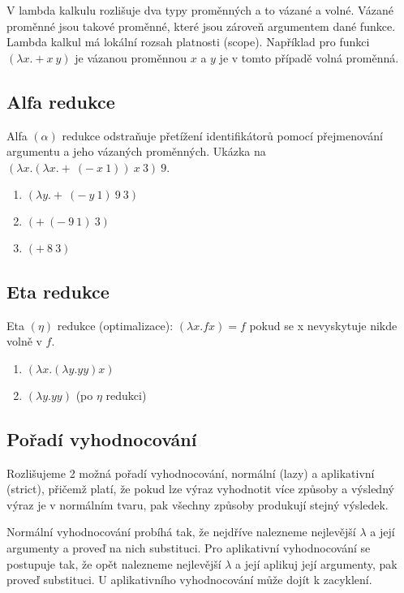 \documentclass{szzclass}
\begin{document}
V lambda kalkulu rozlišuje dva typy proměnných a to vázané a volné. Vázané proměnné jsou takové proměnné, které jsou zároveň argumentem dané funkce. Lambda kalkul má lokální rozsah platnosti (scope). Například pro funkci $(\lambda x . + x\ y)$ je vázanou proměnnou $x$ a $y$ je v tomto případě volná proměnná.

\newpage

\subsection{Alfa redukce}

Alfa $(\alpha)$ redukce odstraňuje přetížení identifikátorů pomocí přejmenování argumentu a jeho vázaných proměnných.
Ukázka na $(\lambda x . (\lambda x . +\ (-\ x\ 1))\ x\ 3)\ 9$.
\begin{enumerate}
    \item $(\lambda y . +\ (-\ y\ 1)\ 9\ 3)$
    \item $(+\ (-\ 9\ 1)\ 3)$
    \item $(+\ 8\ 3)$
\end{enumerate}


\subsection{Eta redukce}
Eta $(\eta)$ redukce (optimalizace): $(\lambda x. fx) = f$ pokud se x nevyskytuje nikde volně v $f$.

\begin{enumerate}
    \item $(\lambda x.(\lambda y.yy)x)$
    \item $(\lambda y. yy)$ (po $\eta$ redukci)
\end{enumerate}


\subsection{Pořadí vyhodnocování}

Rozlišujeme 2 možná pořadí vyhodnocování, normální (lazy) a aplikativní (strict), přičemž platí, že pokud lze výraz
vyhodnotit více způsoby a výsledný výraz je v normálním tvaru, pak všechny způsoby produkují stejný výsledek.

Normální vyhodnocování probíhá tak, že nejdříve nalezneme nejlevější $\lambda$ a její argumenty a proveď na nich substituci.
Pro aplikativní vyhodnocování se postupuje tak, že opět nalezneme nejlevější $\lambda$ a její aplikuj její argumenty, pak proveď substituci.
U aplikativního vyhodnocování může dojít k zacyklení.
\end{document}
